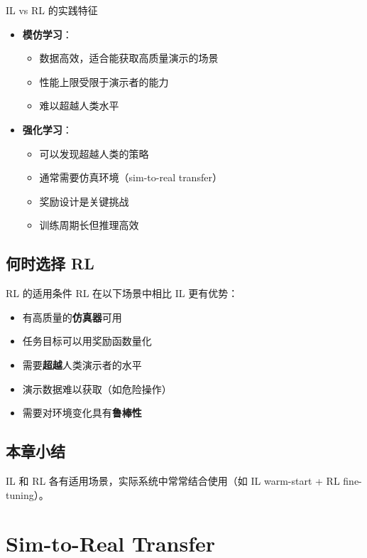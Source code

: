 \documentclass[a4paper]{article}
\begin{document}
\begin{importantbox}{IL vs RL 的实践特征}
\begin{itemize}
    \item \textbf{模仿学习}：
    \begin{itemize}
        \item 数据高效，适合能获取高质量演示的场景
        \item 性能上限受限于演示者的能力
        \item 难以超越人类水平
    \end{itemize}
    \item \textbf{强化学习}：
    \begin{itemize}
        \item 可以发现超越人类的策略
        \item 通常需要仿真环境（sim-to-real transfer）
        \item 奖励设计是关键挑战
        \item 训练周期长但推理高效
    \end{itemize}
\end{itemize}
\end{importantbox}

\subsection{何时选择 RL}

\begin{knowledgebox}{RL 的适用条件}
RL 在以下场景中相比 IL 更有优势：
\begin{itemize}
    \item 有高质量的\textbf{仿真器}可用
    \item 任务目标可以用奖励函数量化
    \item 需要\textbf{超越}人类演示者的水平
    \item 演示数据难以获取（如危险操作）
    \item 需要对环境变化具有\textbf{鲁棒性}
\end{itemize}
\end{knowledgebox}

\subsection{本章小结}

IL 和 RL 各有适用场景，实际系统中常常结合使用（如 IL warm-start + RL fine-tuning）。

\section{Sim-to-Real Transfer}
\end{document}
